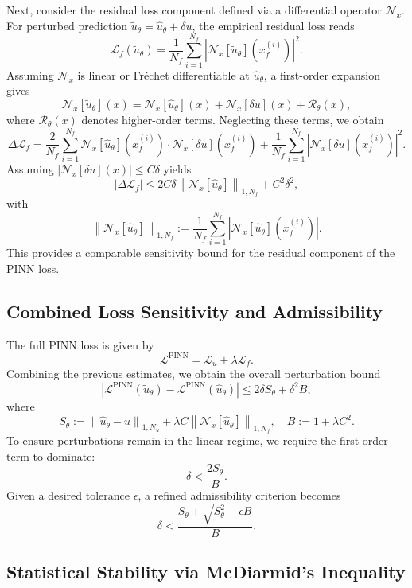 \documentclass[11pt, a4paper]{article}
\begin{document}
Next, consider the residual loss component defined via a differential operator $\mathcal{N}_x$. For perturbed prediction $\tilde{u}_\theta = \hat{u}_\theta + \delta u$, the empirical residual loss reads
\[
\mathcal{L}_f(\tilde{u}_\theta) = \frac{1}{N_f} \sum_{i=1}^{N_f} \left| \mathcal{N}_x[\tilde{u}_\theta](x_f^{(i)}) \right|^2.
\]
Assuming $\mathcal{N}_x$ is linear or Fréchet differentiable at $\hat{u}_\theta$, a first-order expansion gives
\[
\mathcal{N}_x[\tilde{u}_\theta](x) = \mathcal{N}_x[\hat{u}_\theta](x) + \mathcal{N}_x[\delta u](x) + \mathcal{R}_\theta(x),
\]
where $\mathcal{R}_\theta(x)$ denotes higher-order terms. Neglecting these terms, we obtain
\[
\Delta \mathcal{L}_f = \frac{2}{N_f} \sum_{i=1}^{N_f} \mathcal{N}_x[\hat{u}_\theta](x_f^{(i)}) \cdot \mathcal{N}_x[\delta u](x_f^{(i)}) + \frac{1}{N_f} \sum_{i=1}^{N_f} \left| \mathcal{N}_x[\delta u](x_f^{(i)}) \right|^2.
\]
Assuming $|\mathcal{N}_x[\delta u](x)| \leq C \delta$ yields
\[
\left| \Delta \mathcal{L}_f \right| \leq 2C\delta \left\| \mathcal{N}_x[\hat{u}_\theta] \right\|_{1,N_f} + C^2 \delta^2,
\]
with
\[
\left\| \mathcal{N}_x[\hat{u}_\theta] \right\|_{1,N_f} := \frac{1}{N_f} \sum_{i=1}^{N_f} \left| \mathcal{N}_x[\hat{u}_\theta](x_f^{(i)}) \right|.
\]
This provides a comparable sensitivity bound for the residual component of the PINN loss.

\subsection{Combined Loss Sensitivity and Admissibility}

The full PINN loss is given by
\[
\mathcal{L}^{\text{PINN}} = \mathcal{L}_u + \lambda \mathcal{L}_f.
\]
Combining the previous estimates, we obtain the overall perturbation bound
\[
\left| \mathcal{L}^{\text{PINN}}(\tilde{u}_\theta) - \mathcal{L}^{\text{PINN}}(\hat{u}_\theta) \right| \leq 2\delta S_\theta + \delta^2 B,
\]
where
\[
S_\theta := \left\| \hat{u}_\theta - u \right\|_{1,N_u} + \lambda C \left\| \mathcal{N}_x[\hat{u}_\theta] \right\|_{1,N_f}, \quad B := 1 + \lambda C^2.
\]
To ensure perturbations remain in the linear regime, we require the first-order term to dominate:
\[
\delta < \frac{2 S_\theta}{B}.
\]
Given a desired tolerance $\epsilon$, a refined admissibility criterion becomes
\[
\delta < \frac{S_\theta + \sqrt{S_\theta^2 - \epsilon B}}{B}.
\]

\subsection{Statistical Stability via McDiarmid’s Inequality}
\end{document}
